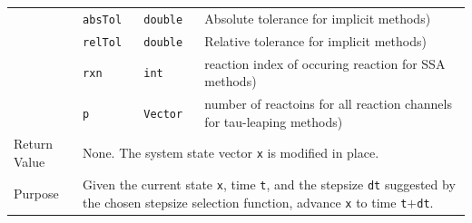 \documentclass[12pt]{article}
\newcommand{\srccode}[1]{\texttt{#1}}
\begin{document}
\begin{table}
\begin{center}
\begin{tabular}{|p{0.75in}|p{0.5in}|p{1.125in}|p{2.625in}|}
                 &  \srccode{absTol} & \srccode{double} &
                       Absolute tolerance for implicit methods) \\
                 &  \srccode{relTol} & \srccode{double} &
                       Relative tolerance for implicit methods) \\
		 &  \srccode{rxn} & \srccode{int} &
                       reaction index of occuring reaction for SSA methods) \\
		 &  \srccode{p} & \srccode{Vector} &
                       number of reactoins for all reaction channels for tau-leaping methods) \\
      \hline
      Return Value & \multicolumn{3}{p{4.5in}|}{None.  The system state vector
                     \srccode{x} is modified in place. } \\
      \hline
      Purpose & \multicolumn{3}{p{4.5in}|}{ Given the current state \srccode{x},
                       time \srccode{t}, and the stepsize \srccode{dt} suggested
                       by the chosen stepsize selection function, advance
                       \srccode{x} to time \srccode{t}$+$\srccode{dt}. } \\
      \hline
    \end{tabular}
  \end{center}
\end{table}
\end{document}
